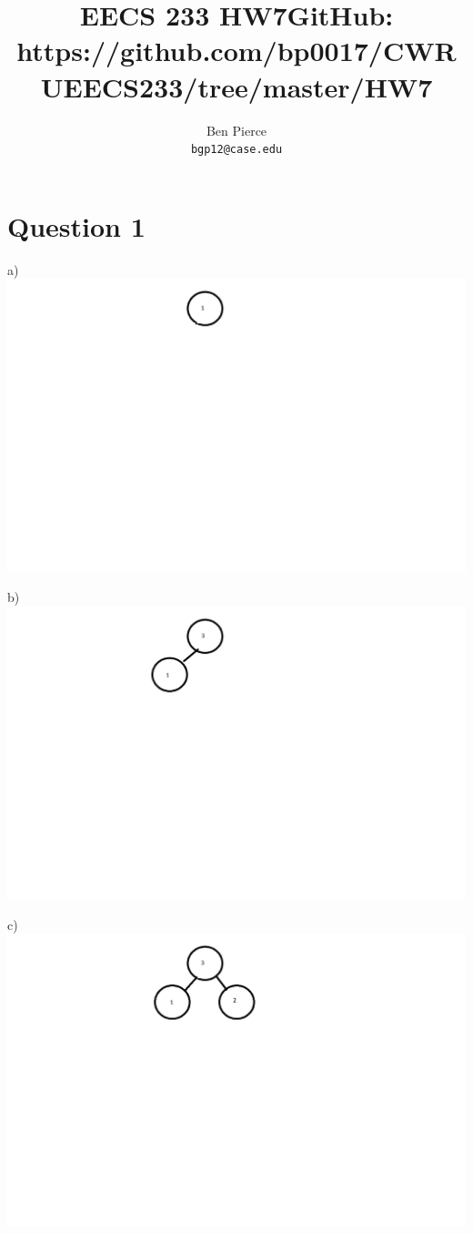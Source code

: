 \documentclass[12pt]{article} %
\title{EECS 233 HW7}
\author{Ben Pierce \\ \texttt{bgp12@case.edu}}
\begin{document}
\maketitle
\title {GitHub: https://github.com/bp0017/CWRUEECS233/tree/master/HW7} 

\section{Question 1}

a)\\
\includegraphics[scale = 0.5]{a.png}

b)\\
\includegraphics[scale = 0.5]{b.png}

c)\\
\includegraphics[scale =0.5]{c.png}
\end{document}
